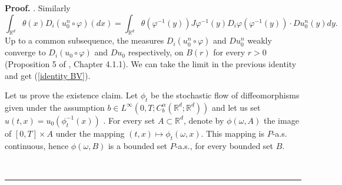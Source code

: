 \documentclass[a4paper,11pt]{article}
\newenvironment{proof}[1][Proof]{\textbf{#1.} }{\ \rule{0.5em}{0.5em}}
\begin{document}
\begin{proof}
. Similarly
\begin{equation*}
\int_{\mathbb{R}^{d}}\theta \left( x\right) D_{i}\left( u_{0}^{n}\circ
\varphi \right) \left( dx\right) =\int_{\mathbb{R}^{d}}\theta \left( \varphi
^{-1}\left( y\right) \right) J\varphi ^{-1}\left( y\right) D_{i}\varphi
\left( \varphi ^{-1}\left( y\right) \right) \cdot Du_{0}^{n}\left( y\right)
dy.
\end{equation*}
Up to a common subsequence, the measures $D_{i}\left( u_{0}^{n}\circ \varphi
\right) $ and $Du_{0}^{n}$ weakly converge to $D_{i}\left( u_{0}\circ
\varphi \right) $ and $Du_{0}$ respectively, on $B\left( r\right) $ for
every $r>0$ (Proposition 5 of \cite{GMS}, Chapter 4.1.1). We can take the
limit in the previous identity and get (\ref{identity BV}).

Let us prove the existence claim. Let $\phi _{t}$ be the stochastic flow of
diffeomorphisms given under the assumption $b\in L^{\infty }\left(
0,T;C_{b}^{\alpha }({\mathbb{R}}^{d};{\mathbb{R}}^{d})\right) $ and let us
set $u\left( t,x\right) =u_{0}\left( \phi _{t}^{-1}\left( x\right) \right) $%
. For every set $A\subset \mathbb{R}^{d}$, denote by $\phi \left( \omega
,A\right) $ the image of $\left[ 0,T\right] \times A$ under the mapping $%
\left( t,x\right) \mapsto \phi _{t}\left( \omega ,x\right) $. This mapping
is $P$-a.s. continuous, hence $\phi \left( \omega ,B\right) $ is a bounded
set $P$-a.s., for every bounded set $B$.


\end{proof}
\end{document}
